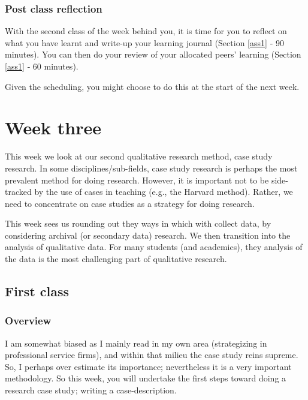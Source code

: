 \documentclass[]{book}
\theoremstyle{definition}
\theoremstyle{definition}
\theoremstyle{definition}
\theoremstyle{remark}
\begin{document}
\hypertarget{post-class-reflection-3}{%
\subsection*{Post class reflection}\label{post-class-reflection-3}}

With the second class of the week behind you, it is time for you to
reflect on what you have learnt and write-up your learning journal
(Section \ref{ass1} ‐ 90 minutes). You can then do your review of your
allocated peers' learning (Section \ref{ass1} ‐ 60 minutes).

Given the scheduling, you might choose to do this at the start of the
next week.

\hypertarget{w3-details}{%
\chapter{Week three}\label{w3-details}}

This week we look at our second qualitative research method, case study
research. In some disciplines/sub-fields, case study research is perhaps
the most prevalent method for doing research. However, it is important
not to be side-tracked by the use of cases in teaching (e.g., the
Harvard method). Rather, we need to concentrate on case studies as a
strategy for doing research.

This week sees us rounding out they ways in which with collect data, by
considering archival (or secondary data) research. We then transition
into the analysis of qualitative data. For many students (and
academics), they analysis of the data is the most challenging part of
qualitative research.

\hypertarget{first-class-2}{%
\section*{First class}\label{first-class-2}}

\hypertarget{overview-4}{%
\subsection*{Overview}\label{overview-4}}

I am somewhat biased as I mainly read in my own area (strategizing in
professional service firms), and within that milieu the case study reins
supreme. So, I perhaps over estimate its importance; nevertheless it is
a very important methodology. So this week, you will undertake the first
steps toward doing a research case study; writing a case-description.
\end{document}
